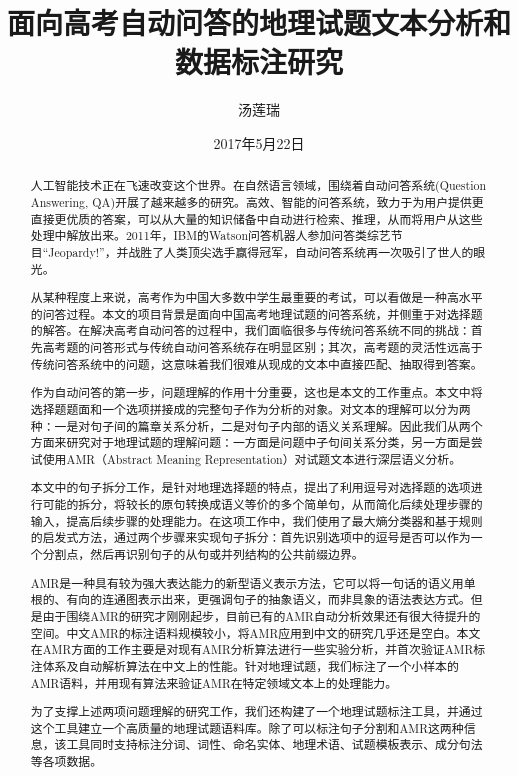 \documentclass[master, winfont]{njuthesis}
\title{面向高考自动问答的地理试题文本分析和数据标注研究}
\author{汤莲瑞}
\institute{南京大学}
\date{2017年5月22日}
\begin{document}

\maketitle
\makeenglishtitle


\frontmatter

\begin{abstract}
人工智能技术正在飞速改变这个世界。在自然语言领域，围绕着自动问答系统(Question Answering, QA)开展了越来越多的研究。高效、智能的问答系统，致力于为用户提供更直接更优质的答案，可以从大量的知识储备中自动进行检索、推理，从而将用户从这些处理中解放出来。2011年，IBM的Watson问答机器人参加问答类综艺节目“Jeopardy!”，并战胜了人类顶尖选手赢得冠军，自动问答系统再一次吸引了世人的眼光。

从某种程度上来说，高考作为中国大多数中学生最重要的考试，可以看做是一种高水平的问答过程。本文的项目背景是面向中国高考地理试题的问答系统，并侧重于对选择题的解答。在解决高考自动问答的过程中，我们面临很多与传统问答系统不同的挑战：首先高考题的问答形式与传统自动问答系统存在明显区别；其次，高考题的灵活性远高于传统问答系统中的问题，这意味着我们很难从现成的文本中直接匹配、抽取得到答案。

作为自动问答的第一步，问题理解的作用十分重要，这也是本文的工作重点。本文中将选择题题面和一个选项拼接成的完整句子作为分析的对象。对文本的理解可以分为两种：一是对句子间的篇章关系分析，二是对句子内部的语义关系理解。因此我们从两个方面来研究对于地理试题的理解问题：一方面是问题中子句间关系分类，另一方面是尝试使用AMR（Abstract Meaning Representation）对试题文本进行深层语义分析。

本文中的句子拆分工作，是针对地理选择题的特点，提出了利用逗号对选择题的选项进行可能的拆分，将较长的原句转换成语义等价的多个简单句，从而简化后续处理步骤的输入，提高后续步骤的处理能力。在这项工作中，我们使用了最大熵分类器和基于规则的启发式方法，通过两个步骤来实现句子拆分：首先识别选项中的逗号是否可以作为一个分割点，然后再识别句子的从句或并列结构的公共前缀边界。

AMR是一种具有较为强大表达能力的新型语义表示方法，它可以将一句话的语义用单根的、有向的连通图表示出来，更强调句子的抽象语义，而非具象的语法表达方式。但是由于围绕AMR的研究才刚刚起步，目前已有的AMR自动分析效果还有很大待提升的空间。中文AMR的标注语料规模较小，将AMR应用到中文的研究几乎还是空白。本文在AMR方面的工作主要是对现有AMR分析算法进行一些实验分析，并首次验证AMR标注体系及自动解析算法在中文上的性能。针对地理试题，我们标注了一个小样本的AMR语料，并用现有算法来验证AMR在特定领域文本上的处理能力。

为了支撑上述两项问题理解的研究工作，我们还构建了一个地理试题标注工具，并通过这个工具建立一个高质量的地理试题语料库。除了可以标注句子分割和AMR这两种信息，该工具同时支持标注分词、词性、命名实体、地理术语、试题模板表示、成分句法等各项数据。

\end{abstract}
\end{document}
